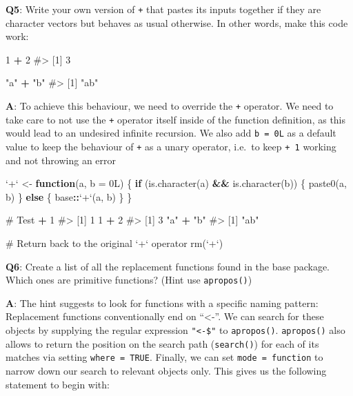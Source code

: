 \documentclass[
]{krantz}
\makeatletter
\newenvironment{Shaded}{\begin{snugshade}}{\end{snugshade}}
\newcommand{\CommentTok}[1]{\textcolor[rgb]{0.56,0.35,0.01}{\textit{#1}}}
\newcommand{\ControlFlowTok}[1]{\textcolor[rgb]{0.13,0.29,0.53}{\textbf{#1}}}
\newcommand{\DataTypeTok}[1]{\textcolor[rgb]{0.13,0.29,0.53}{#1}}
\newcommand{\DecValTok}[1]{\textcolor[rgb]{0.00,0.00,0.81}{#1}}
\newcommand{\KeywordTok}[1]{\textcolor[rgb]{0.13,0.29,0.53}{\textbf{#1}}}
\newcommand{\NormalTok}[1]{#1}
\newcommand{\OperatorTok}[1]{\textcolor[rgb]{0.81,0.36,0.00}{\textbf{#1}}}
\newcommand{\StringTok}[1]{\textcolor[rgb]{0.31,0.60,0.02}{#1}}
\newenvironment{kframe}{%
\medskip{}
\setlength{\fboxsep}{.8em}
 \def\at@end@of@kframe{}%
 \ifinner\ifhmode%
  \def\at@end@of@kframe{\end{minipage}}%
  \begin{minipage}{\columnwidth}%
 \fi\fi%
 \def\FrameCommand##1{\hskip\@totalleftmargin \hskip-\fboxsep
 \colorbox{shadecolor}{##1}\hskip-\fboxsep
     \hskip-\linewidth \hskip-\@totalleftmargin \hskip\columnwidth}%
 \MakeFramed {\advance\hsize-\width
   \@totalleftmargin\z@ \linewidth\hsize
   \@setminipage}}%
 {\par\unskip\endMakeFramed%
 \at@end@of@kframe}
\renewenvironment{Shaded}{\begin{kframe}}{\end{kframe}}
\renewcommand{\KeywordTok} [1]{\textcolor[rgb]{0.00,0.44,0.13}{{#1}}}
\renewcommand{\DataTypeTok}[1]{\textcolor[rgb]{0.56,0.13,0.00}{{#1}}}
\renewcommand{\DecValTok}  [1]{\textcolor[rgb]{0.25,0.63,0.44}{{#1}}}
\renewcommand{\StringTok}  [1]{\textcolor[rgb]{0.25,0.44,0.63}{{#1}}}
\renewcommand{\CommentTok} [1]{\textcolor[rgb]{0.38,0.63,0.69}{{#1}}}
\renewcommand{\NormalTok}  [1]{{#1}}
\makeatother
\begin{document}
\textbf{{Q5}}: Write your own version of \texttt{+} that pastes its inputs together if they are character vectors but behaves as usual otherwise. In other words, make this code work:

\begin{Shaded}
\begin{Highlighting}[]
\DecValTok{1} \OperatorTok{+}\StringTok{ }\DecValTok{2}
\CommentTok{#> [1] 3}

\StringTok{"a"} \OperatorTok{+}\StringTok{ "b"}
\CommentTok{#> [1] "ab"}
\end{Highlighting}
\end{Shaded}

\textbf{{A}}: To achieve this behaviour, we need to override the \texttt{+} operator. We need to take care to not use the \texttt{+} operator itself inside of the function definition, as this would lead to an undesired infinite recursion. We also add \texttt{b\ =\ 0L} as a default value to keep the behaviour of \texttt{+} as a unary operator, i.e.~to keep \texttt{+\ 1} working and not throwing an error

\begin{Shaded}
\begin{Highlighting}[]
\StringTok{`}\DataTypeTok{+}\StringTok{`}\NormalTok{ <-}\StringTok{ }\ControlFlowTok{function}\NormalTok{(a, }\DataTypeTok{b =}\NormalTok{ 0L) \{}
  \ControlFlowTok{if}\NormalTok{ (}\KeywordTok{is.character}\NormalTok{(a) }\OperatorTok{&&}\StringTok{ }\KeywordTok{is.character}\NormalTok{(b)) \{}
    \KeywordTok{paste0}\NormalTok{(a, b)}
\NormalTok{  \} }\ControlFlowTok{else}\NormalTok{ \{}
\NormalTok{    base}\OperatorTok{::}\StringTok{`}\DataTypeTok{+}\StringTok{`}\NormalTok{(a, b)}
\NormalTok{  \}}
\NormalTok{\}}

\CommentTok{# Test}
\OperatorTok{+}\StringTok{ }\DecValTok{1}
\CommentTok{#> [1] 1}
\DecValTok{1} \OperatorTok{+}\StringTok{ }\DecValTok{2}
\CommentTok{#> [1] 3}
\StringTok{"a"} \OperatorTok{+}\StringTok{ "b"}
\CommentTok{#> [1] "ab"}

\CommentTok{# Return back to the original `+` operator}
\KeywordTok{rm}\NormalTok{(}\StringTok{`}\DataTypeTok{+}\StringTok{`}\NormalTok{)}
\end{Highlighting}
\end{Shaded}

\textbf{{Q6}}: Create a list of all the replacement functions found in the base package. Which ones are primitive functions? (Hint use \texttt{apropos()})

\textbf{{A}}: The hint suggests to look for functions with a specific naming pattern: Replacement functions conventionally end on ``\textless-''. We can search for these objects by supplying the regular expression \texttt{"\textless{}-\$"} to \texttt{apropos()}. \texttt{apropos()} also allows to return the position on the search path (\texttt{search()}) for each of its matches via setting \texttt{where\ =\ TRUE}. Finally, we can set \texttt{mode\ =\ function} to narrow down our search to relevant objects only. This gives us the following statement to begin with:
\end{document}
